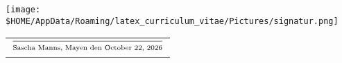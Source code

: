 \documentclass[a4paper]{friggeri-cv} %
\begin{document}


\begin{center}
\texttt{[image: \$HOME/AppData/Roaming/latex\_curriculum\_vitae/Pictures/signatur.png]} \\
\begin{tabular}{@{}l@{}}
\\ $\frac{}{\strut\textnormal{Sascha Manns, Mayen den \today}}$
\end{tabular}
\end{center}

\end{document}
